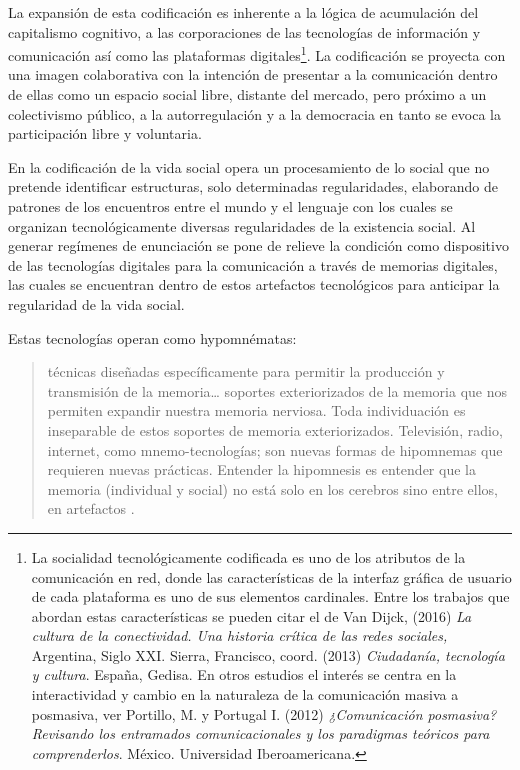 \documentclass[
  spanish,
  11pt,
  a4paper,
]{scrbook}
\begin{document}
La expansión de esta codificación es inherente a la lógica de
acumulación del capitalismo cognitivo, a las corporaciones de las
tecnologías de información y comunicación así como las plataformas
digitales\footnote{La socialidad tecnológicamente codificada es uno de
  los atributos de la comunicación en red, donde las características de
  la interfaz gráfica de usuario de cada plataforma es uno de sus
  elementos cardinales. Entre los trabajos que abordan estas
  características se pueden citar el de Van Dijck, (2016) \emph{La
  cultura de la conectividad. Una historia crítica de las redes
  sociales,} Argentina, Siglo XXI. Sierra, Francisco, coord. (2013)
  \emph{Ciudadanía, tecnología y cultura}. España, Gedisa. En otros
  estudios el interés se centra en la interactividad y cambio en la
  naturaleza de la comunicación masiva a posmasiva, ver Portillo, M. y
  Portugal I. (2012) \emph{¿Comunicación posmasiva? Revisando los
  entramados comunicacionales y los paradigmas teóricos para
  comprenderlos}. México. Universidad Iberoamericana.}. La codificación
se proyecta con una imagen colaborativa con la intención de presentar a
la comunicación dentro de ellas como un espacio social libre, distante
del mercado, pero próximo a un colectivismo público, a la
autorregulación y a la democracia en tanto se evoca la participación
libre y voluntaria.

En la codificación de la vida social opera un procesamiento de lo social
que no pretende identificar estructuras, solo determinadas
regularidades, elaborando de patrones de los encuentros entre el mundo y
el lenguaje con los cuales se organizan tecnológicamente diversas
regularidades de la existencia social. Al generar regímenes de
enunciación se pone de relieve la condición como dispositivo de las
tecnologías digitales para la comunicación a través de memorias
digitales, las cuales se encuentran dentro de estos artefactos
tecnológicos para anticipar la regularidad de la vida social.

Estas tecnologías operan como hypomnématas:

\begin{quote}
técnicas diseñadas específicamente para permitir la producción y
transmisión de la memoria\ldots{} soportes exteriorizados de la memoria
que nos permiten expandir nuestra memoria nerviosa. Toda individuación
es inseparable de estos soportes de memoria exteriorizados. Televisión,
radio, internet, como mnemo-tecnologías; son nuevas formas de hipomnemas
que requieren nuevas prácticas. Entender la hipomnesis es entender que
la memoria (individual y social) no está solo en los cerebros sino entre
ellos, en artefactos \autocite[Stiegler s/f en][139]{Berti2017}.
\end{quote}
\end{document}
